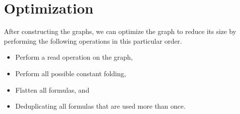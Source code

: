 \documentclass{article}
\begin{document}
\section{Optimization}

After constructing the graphs, we can optimize the graph to reduce its size by performing the following operations in this particular order.
%
\begin{itemize}
	\item Perform a read operation on the graph,
	\item Perform all possible constant folding,
	\item Flatten all formulas, and
	\item Deduplicating all formulas that are used more than once.
\end{itemize}
\end{document}
